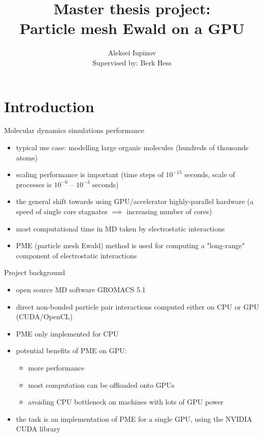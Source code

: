 \documentclass[11pt]{beamer}
\author[Aleksei Iupinov]{Aleksei Iupinov \\{\footnotesize Supervised by: Berk Hess}}
\title{Master thesis project: \\Particle mesh Ewald on a GPU}
\institute{KTH Royal Institute of Technology}
\begin{document}
\captionsetup[figure]{labelformat=empty}

\begin{frame}
\titlepage
\end{frame}


\section{Introduction}
\begin{frame}{Molecular dynamics simulations performance}
\begin{itemize}
\item typical use case: modelling large organic molecules (hundreds of thousands atoms)
\item scaling performance is important (time steps of $10^{-15}$ seconds, scale of processes is $10^{-6}$ -- $10^{-3}$ seconds) 
\item the general shift towards using GPU/accelerator highly-parallel hardware (a speed of single core stagnates $\implies$ increasing number of cores)
\item most computational time in MD taken by electrostatic interactions
\item PME (particle mesh Ewald) method is used for computing a "long-range" component of electrostatic interactions
\end{itemize}
\end{frame}

\begin{frame}{Project background}
\begin{itemize}
\item open source MD software GROMACS 5.1
\item direct non-bonded particle pair interactions computed either on CPU or GPU (CUDA/OpenCL) 
\item PME only implemented for CPU
\item potential benefits of PME on GPU:
\begin{itemize}
\item more performance
\item most computation can be offloaded onto GPUs
\item avoiding CPU bottleneck on machines with lots of GPU power  
\end{itemize}
\item the task is an implementation of PME for a single GPU, using the NVIDIA CUDA library 
\end{itemize}
\end{frame}
\end{document}
